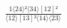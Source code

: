 \documentclass[varwidth, border=5pt]{standalone}
\begin{document}
\begin{my}
$\begin{gathered}
\scriptscriptstyle\frac{1⟨24⟩²⟨34⟩[12]²}{⟨12⟩[13]²⟨14⟩⟨23⟩}
\end{gathered}$
\end{my}
\end{document}
